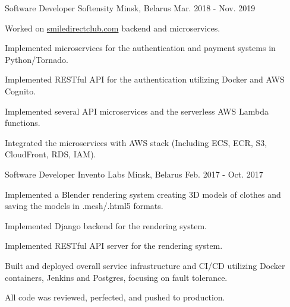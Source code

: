 \begin{cventries}
  \cventry
    {Software Developer} %
    {Softensity} %
    {Minsk, Belarus} %
    {Mar. 2018 - Nov. 2019} %
    {
      \begin{cvitems} %
        \item {Worked on \href{www.smiledirectclub.com}{smiledirectclub.com} backend and microservices.}
        \item {Implemented microservices for the authentication and payment systems in Python/Tornado.}
        \item {Implemented RESTful API for the authentication utilizing Docker and AWS Cognito.}
        \item {Implemented several API microservices and the serverless AWS Lambda functions.}
        \item {Integrated the microservices with AWS stack (Including ECS, ECR, S3, CloudFront, RDS, IAM).}
      \end{cvitems}
    }

  \cventry
    {Software Developer} %
    {Invento Labs} %
    {Minsk, Belarus} %
    {Feb. 2017 - Oct. 2017} %
    {
      \begin{cvitems} %
        \item {Implemented a Blender rendering system creating 3D models of clothes and saving the models in .mesh/.html5 formats.}
        \item {Implemented Django backend for the rendering system.}
        \item {Implemented RESTful API server for the rendering system.}
        \item {Built and deployed overall service infrastructure and CI/CD utilizing Docker containers, Jenkins and Postgres, focusing on fault tolerance.}
        \item {All code was reviewed, perfected, and pushed to production.}
      \end{cvitems}
    }

\end{cventries}
